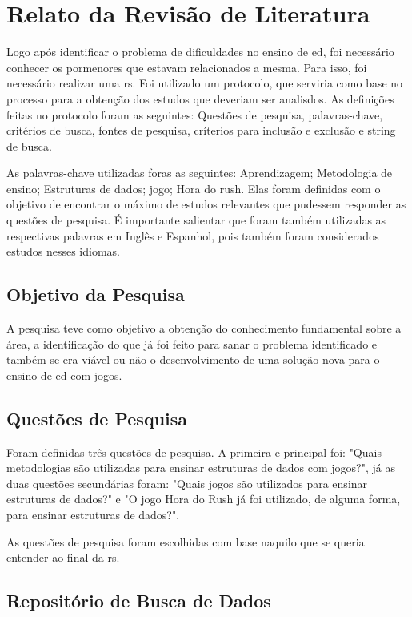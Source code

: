 \documentclass[12pt]{article}
\begin{document}
\section{Relato da Revisão de Literatura}

Logo após identificar o problema de dificuldades no ensino de \gls{ed}, foi necessário conhecer os pormenores que estavam relacionados a mesma. Para isso, foi necessário realizar uma \gls{rs}. Foi utilizado um protocolo, que serviria como base no processo para a obtenção dos estudos que deveriam ser analisdos. As definições feitas no protocolo foram as seguintes: Questões de pesquisa, palavras-chave, critérios de busca, fontes de pesquisa, críterios para inclusão e exclusão e string de busca.

As palavras-chave utilizadas foras as seguintes: Aprendizagem; Metodologia de ensino; Estruturas de dados; jogo; Hora do rush.
Elas foram definidas com o objetivo de encontrar o máximo de estudos relevantes que pudessem responder as questões de pesquisa. É importante salientar que foram também utilizadas as respectivas palavras em Inglês e Espanhol, pois também foram considerados estudos nesses idiomas.

\subsection{Objetivo da Pesquisa}

A pesquisa teve como objetivo a obtenção do conhecimento fundamental sobre a área, a identificação do que já foi feito para sanar o problema identificado e também se era viável ou não o desenvolvimento de uma solução nova para o ensino de \gls{ed} com jogos.

\subsection{Questões de Pesquisa}

Foram definidas três questões de pesquisa. A primeira e principal foi: "Quais metodologias são utilizadas para ensinar estruturas de dados com jogos?", já as duas questões secundárias foram: "Quais jogos são utilizados para ensinar estruturas de dados?" e "O jogo Hora do Rush já foi utilizado, de alguma forma, para ensinar estruturas de dados?".

As questões de pesquisa foram escolhidas com base naquilo que se queria entender ao final da \gls{rs}.

\subsection{Repositório de Busca de Dados}
\end{document}
